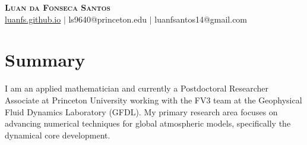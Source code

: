 \documentclass[letterpaper,11pt]{article}
\begin{document}

\begin{center}
    \textbf{\Huge \scshape Luan da Fonseca Santos} \\ \vspace{1pt}
    \href{https://luanfs.github.io}{luanfs.github.io} $|$
    ls9640@princeton.edu
    $|$  
    {luanfsantos14@gmail.com} 
\end{center}

\section{Summary}
I am an applied mathematician and currently a Postdoctoral Researcher Associate at Princeton University working with the FV3 team at the Geophysical Fluid Dynamics Laboratory (GFDL).
My primary research area focuses on advancing numerical techniques for global atmospheric models, specifically the dynamical core development.

\end{document}
